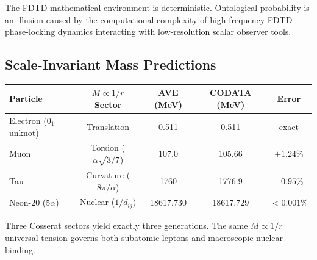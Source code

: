 The FDTD mathematical environment is deterministic. Ontological probability is an illusion caused by the computational complexity of high-frequency FDTD phase-locking dynamics interacting with low-resolution scalar observer tools.

\subsection*{Scale-Invariant Mass Predictions}
\begin{center}
\small
\renewcommand{\arraystretch}{1.2}
\begin{tabular}{lcccc}
\toprule
\textbf{Particle} & \textbf{$M \propto 1/r$ Sector} & \textbf{AVE (MeV)} & \textbf{CODATA (MeV)} & \textbf{Error} \\
\midrule
Electron ($0_1$ unknot) & Translation     & 0.511  & 0.511  & exact \\
Muon                    & Torsion ($\alpha\sqrt{3/7}$) & 107.0 & 105.66 & $+1.24\%$ \\
Tau                     & Curvature ($8\pi/\alpha$)    & 1760  & 1776.9 & $-0.95\%$ \\
\midrule
Neon-20 ($5\alpha$)     & Nuclear ($1/d_{ij}$) & 18617.730 & 18617.729 & $<0.001\%$ \\
\bottomrule
\end{tabular}
\end{center}

\noindent Three Cosserat sectors yield exactly three generations. The same $M \propto 1/r$ universal tension governs both subatomic leptons and macroscopic nuclear binding.
